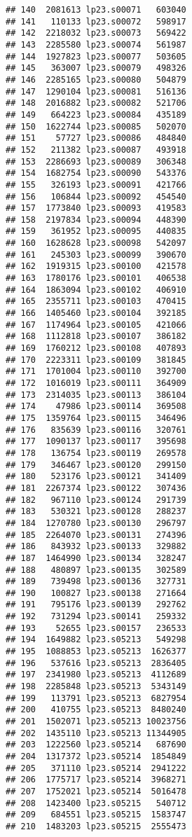 \documentclass[
]{article}
\begin{document}
\begin{verbatim}
## 140  2081613 lp23.s00071   603040
## 141   110133 lp23.s00072   598917
## 142  2218032 lp23.s00073   569422
## 143  2285580 lp23.s00074   561987
## 144  1927823 lp23.s00077   503605
## 145   363007 lp23.s00079   498326
## 146  2285165 lp23.s00080   504879
## 147  1290104 lp23.s00081   516136
## 148  2016882 lp23.s00082   521706
## 149   664223 lp23.s00084   435189
## 150  1622744 lp23.s00085   502070
## 151    57727 lp23.s00086   484840
## 152   211382 lp23.s00087   493918
## 153  2286693 lp23.s00089   306348
## 154  1682754 lp23.s00090   543376
## 155   326193 lp23.s00091   421766
## 156   106844 lp23.s00092   454540
## 157  1773840 lp23.s00093   419583
## 158  2197834 lp23.s00094   448390
## 159   361952 lp23.s00095   440835
## 160  1628628 lp23.s00098   542097
## 161   245303 lp23.s00099   390670
## 162  1919315 lp23.s00100   421578
## 163  1780176 lp23.s00101   406538
## 164  1863094 lp23.s00102   406910
## 165  2355711 lp23.s00103   470415
## 166  1405460 lp23.s00104   392185
## 167  1174964 lp23.s00105   421066
## 168  1112818 lp23.s00107   386182
## 169  1760212 lp23.s00108   407893
## 170  2223311 lp23.s00109   381845
## 171  1701004 lp23.s00110   392700
## 172  1016019 lp23.s00111   364909
## 173  2314035 lp23.s00113   386104
## 174    47986 lp23.s00114   369508
## 175  1359764 lp23.s00115   346496
## 176   835639 lp23.s00116   320761
## 177  1090137 lp23.s00117   395698
## 178   136754 lp23.s00119   269578
## 179   346467 lp23.s00120   299150
## 180   523176 lp23.s00121   341409
## 181  2267374 lp23.s00122   307436
## 182   967110 lp23.s00124   291739
## 183   530321 lp23.s00128   288237
## 184  1270780 lp23.s00130   296797
## 185  2264070 lp23.s00131   274396
## 186   843932 lp23.s00133   329882
## 187  1464990 lp23.s00134   328247
## 188   480897 lp23.s00135   302589
## 189   739498 lp23.s00136   327731
## 190   100827 lp23.s00138   271664
## 191   795176 lp23.s00139   292762
## 192   731294 lp23.s00141   259332
## 193    52655 lp23.s00157   236533
## 194  1649882 lp23.s05213   549298
## 195  1088853 lp23.s05213  1626377
## 196   537616 lp23.s05213  2836405
## 197  2341980 lp23.s05213  4112689
## 198  2285848 lp23.s05213  5343149
## 199   113791 lp23.s05213  6827954
## 200   410755 lp23.s05213  8480240
## 201  1502071 lp23.s05213 10023756
## 202  1435110 lp23.s05213 11344905
## 203  1222560 lp23.s05214   687690
## 204  1317372 lp23.s05214  1854849
## 205   371110 lp23.s05214  2941222
## 206  1775717 lp23.s05214  3968271
## 207  1752021 lp23.s05214  5016478
## 208  1423400 lp23.s05215   540712
## 209   684551 lp23.s05215  1583747
## 210  1483203 lp23.s05215  2555473

\end{verbatim}
\end{document}
